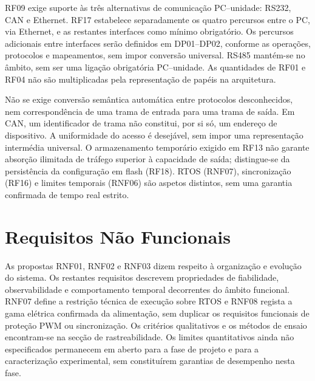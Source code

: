 RF09 exige suporte às três alternativas de comunicação PC--unidade:
RS232, CAN e Ethernet. RF17 estabelece separadamente os quatro percursos
entre o PC, via Ethernet, e as restantes interfaces como mínimo obrigatório. Os percursos adicionais entre interfaces
serão definidos em DP01--DP02, conforme as operações, protocolos e
mapeamentos, sem impor conversão universal. RS485 mantém-se no âmbito,
sem ser uma ligação obrigatória PC--unidade. As quantidades de RF01 e RF04
não são multiplicadas pela representação de papéis na arquitetura.

Não se exige conversão semântica automática entre protocolos desconhecidos,
nem correspondência de uma trama de entrada para uma trama de saída.
Em CAN, um identificador de trama não constitui, por si só, um endereço
de dispositivo. A uniformidade do acesso é desejável, sem impor uma
representação intermédia universal. O armazenamento temporário exigido
em RF13 não garante absorção ilimitada de tráfego superior à capacidade
de saída; distingue-se da persistência da configuração em flash (RF18).
RTOS (RNF07), sincronização (RF16) e limites temporais (RNF06) são aspetos
distintos, sem uma garantia confirmada de tempo real estrito.

\section{Requisitos Não Funcionais}

As propostas RNF01, RNF02 e RNF03 dizem respeito à organização e evolução
do sistema. Os restantes requisitos descrevem propriedades de fiabilidade,
observabilidade e comportamento temporal decorrentes do âmbito funcional.
RNF07 define a restrição técnica de execução sobre RTOS e RNF08 regista
a gama elétrica confirmada da alimentação, sem duplicar os requisitos
funcionais de proteção PWM ou sincronização.
Os critérios qualitativos e os métodos de ensaio encontram-se na secção
de rastreabilidade. Os limites quantitativos ainda não especificados
permanecem em aberto para a fase de projeto e para a caracterização
experimental, sem constituírem garantias de desempenho nesta fase.

